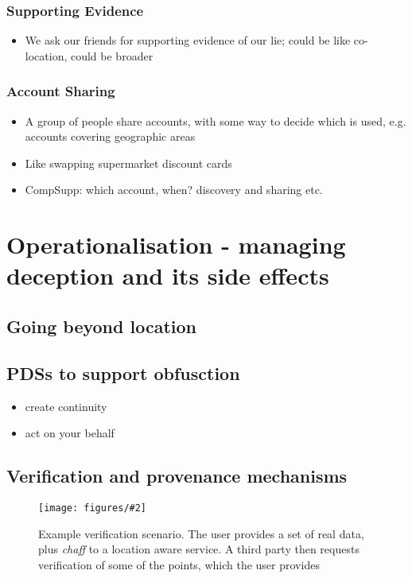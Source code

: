 \documentclass{IOS-Book-Article}     %
\newcommand{\fig}[3][0.9]{
\begin{figure}[tp]
\begin{center}
\texttt{[image: figures/\#2]}
\caption{#3}
\label{fig:#2}
\end{center}
\end{figure}
}
\begin{document}
\subsubsection{Supporting Evidence}
\begin{itemize}
  \item We ask our friends for supporting evidence of our lie; could be like
  co-location, could be broader
\end{itemize}

\subsubsection{Account Sharing}
\begin{itemize}
  \item A group of people share accounts, with some way to decide which is
  used, e.g. accounts covering geographic areas
  \item Like swapping supermarket discount cards
  \item CompSupp: which account, when? discovery and sharing etc.
\end{itemize}

\section{Operationalisation - managing deception and its side effects}

\subsection{Going beyond location}

\subsection{PDSs to support obfusction}
\begin{itemize}
  \item create continuity
  \item act on your behalf
\end{itemize}

\subsection{Verification and provenance mechanisms}

\fig{Verification}{Example verification scenario. The user provides a set of
real data, plus \emph{chaff} to a location aware service. A third party then
requests verification of some of the points, which the user provides}
\end{document}
